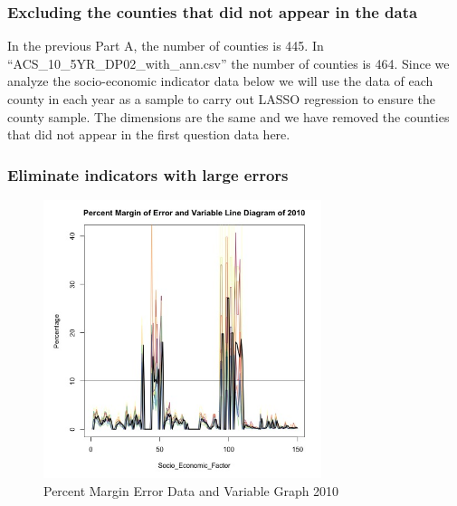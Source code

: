 \documentclass{mcmthesis}
\begin{document}
\subsubsection{Excluding the counties that did not appear in the data}

In the previous Part A, the number of counties is 445.  In “ACS\_10\_5YR\_DP02\_with\_ann.csv” the number of counties is 464. Since we analyze the socio-economic indicator data below we will use the data of each county in each year as a sample to carry out LASSO regression to ensure the county sample.  The dimensions are the same and we have removed the counties that did not appear in the first question data here.





\subsubsection{Eliminate indicators with large errors}


 \begin{figure}[H]
\centering
\includegraphics[width=3.2in]{figures/PercentMarginErrorDataGraphVariable2010.jpeg}
\caption{Percent Margin Error Data and Variable Graph 2010 \protect\footnotemark}
\label{Percent Margin Error Data and Variable Graph 2010}

\end{figure}
 
\end{document}
